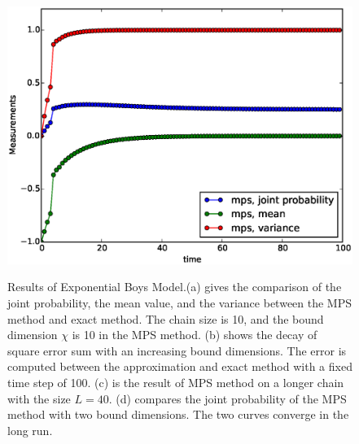 \begin{figure}[htbp]
{\includegraphics[scale=0.4]{Result_Fig/Exponential_MPS_t100_s40_bd10.eps}}\hfill
{}
  \caption{Results of Exponential Boys Model.(a) gives the comparison of the joint probability, the mean value, and the variance between the MPS method and exact method. The chain size is 10, and the bound dimension $\chi$ is 10 in the MPS method. (b) shows the decay of square error sum with an increasing bound dimensions. The error is computed between the approximation and exact method with a fixed time step of 100. (c) is the result of MPS method on a longer chain with the size $L=40$. (d) compares the joint probability of the MPS method with two bound dimensions. The two curves converge in the long run.}
  \label{fig:Exponential_result}
\end{figure}

